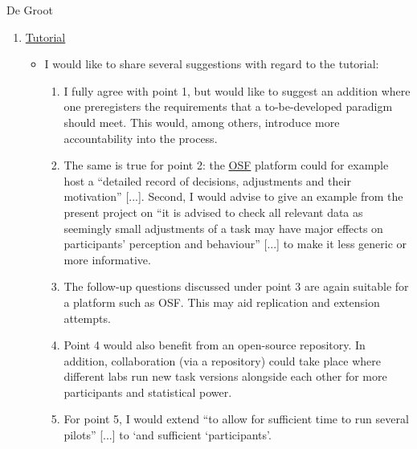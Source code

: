 \documentclass[twocolumn, serif, authordate, review]{jote-article}
\begin{document}
\begin{paracol}{2}
\begin{reviewend}{De Groot}
\begin{enumerate}[label=\textbf{\arabic*}), start=0]
    \item \hyperref[sec:tutorial]{Tutorial}
        \begin{itemize}
            \item I would like to share several suggestions with regard to the tutorial:
            \begin{enumerate}
                \item I fully agree with point 1, but would like to suggest an addition where one preregisters the requirements that a to-be-developed paradigm should meet. This would, among others, introduce more accountability into the process.
                \item The same is true for point 2: the \href{https://osf.io/}{OSF} platform could for example host a ``detailed record of decisions, adjustments and their motivation'' [...]. Second, I would advise to give an example from the present project on ``it is advised to check all relevant data as seemingly small adjustments of a task may have major effects on participants' perception and behaviour'' [...] to make it less generic or more informative.
                \item The follow-up questions discussed under point 3 are again suitable for a platform such as OSF. This may aid replication and extension attempts.
                \item Point 4 would also benefit from an open-source repository. In addition, collaboration (via a repository) could take place where different labs run new task versions alongside each other for more participants and statistical power.
                \item For point 5, I would extend ``to allow for sufficient time to run several pilots'' [...] to `and sufficient `participants'.
            \end{enumerate}
        \end{itemize}
    \end{enumerate}
\end{reviewend}
\end{paracol}





\end{document}
